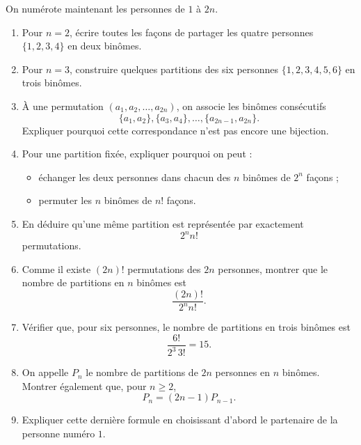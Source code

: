 On numérote maintenant les personnes de $1$ à $2n$.
\begin{enumerate}
  \item Pour $n = 2$, écrire toutes les façons de partager les quatre
  personnes $\{1, 2, 3, 4\}$ en deux binômes.
  \item Pour $n = 3$, construire quelques partitions des six personnes
  $\{1, 2, 3, 4, 5, 6\}$ en trois binômes.
  \item À une permutation $(a_1, a_2, \ldots, a_{2n})$, on associe les binômes
  consécutifs
  \[
  \{a_1, a_2\}, \{a_3, a_4\}, \ldots, \{a_{2n-1}, a_{2n}\}.
  \]
  Expliquer pourquoi cette correspondance n'est pas encore une bijection.
  \item Pour une partition fixée, expliquer pourquoi on peut :
  \begin{itemize}
    \item échanger les deux personnes dans chacun des $n$ binômes de $2^n$
    façons ;
    \item permuter les $n$ binômes de $n!$ façons.
  \end{itemize}
  \item En déduire qu'une même partition est représentée par exactement
  \[
  2^n n!
  \]
  permutations.
  \item Comme il existe $(2n)!$ permutations des $2n$ personnes, montrer que
  le nombre de partitions en $n$ binômes est
  \[
  \frac{(2n)!}{2^n n!}.
  \]
  \item Vérifier que, pour six personnes, le nombre de partitions en trois
  binômes est
  \[
  \frac{6!}{2^3\, 3!} = 15.
  \]
  \item On appelle $P_n$ le nombre de partitions de $2n$ personnes en $n$
  binômes. Montrer également que, pour $n \ge 2$,
  \[
  P_n = (2n - 1) P_{n-1}.
  \]
  \item Expliquer cette dernière formule en choisissant d'abord le partenaire
  de la personne numéro $1$.
\end{enumerate}
